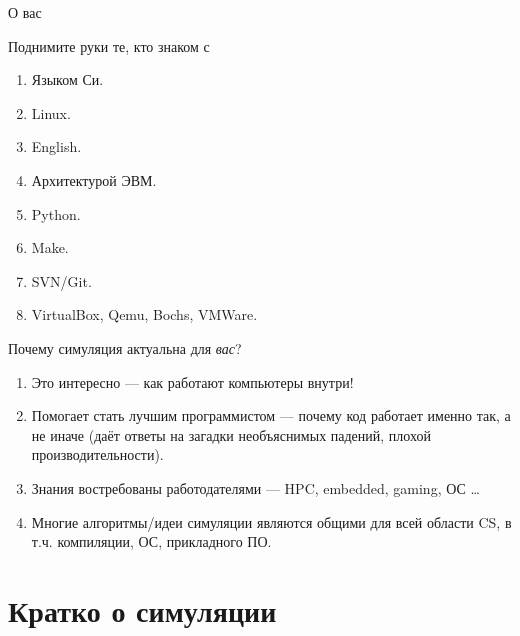 \documentclass{beamer}
\begin{document}
\begin{frame}{О вас}

Поднимите руки те, кто знаком с\pause
\begin{enumerate}
\item Языком Си.\pause
\item Linux.\pause
\item English.\pause
\item Архитектурой ЭВМ.\pause
\item Python.\pause
\item Make.\pause
\item SVN/Git.\pause
\item VirtualBox, Qemu, Bochs, VMWare.
\end{enumerate}

\end{frame}

\begin{frame}{Почему симуляция актуальна для \emph{вас}?}

\begin{enumerate}
\item Это интересно — как работают компьютеры внутри!
\item Помогает стать лучшим программистом — почему код работает именно так, а не иначе (даёт ответы на загадки необъяснимых падений, плохой производительности).
\item Знания востребованы работодателями — HPC, embedded, gaming, ОС \dots
\item Многие алгоритмы/идеи симуляции являются общими для всей области CS, в т.ч. компиляции, ОС, прикладного ПО.
\end{enumerate}

\end{frame} 

\section{Кратко о симуляции}
\end{document}
